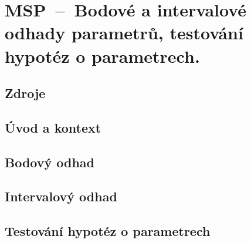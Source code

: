 

\graphicspath{{msp/odhady_parametru/figures}}


\chapter{MSP~--~Bodové a intervalové odhady parametrů, testování hypotéz o parametrech.}


\section{Zdroje}

\begin{compactitem}
    \item {}
\end{compactitem}


\section{Úvod a kontext}



\section{Bodový odhad}



\section{Intervalový odhad}



\section{Testování hypotéz o parametrech}


